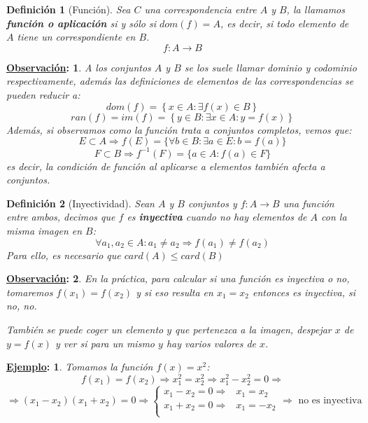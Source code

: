 \documentclass[10pt,a4paper,openright]{book}
\theoremstyle{break}
\newtheorem*{defi}{Definición}
\newtheorem*{obs}{\underline{Observación}:}
\newtheorem*{ej}{\underline{Ejemplo}:}
\begin{document}
\begin{defi}[Función]
Sea $C$ una correspondencia entre $A$ y $B$, la llamamos \textbf{función o aplicación} si y sólo si $dom(f)=A$, es decir, si todo elemento de $A$ tiene un correspondiente en $B$.
$$f: A\rightarrow B$$
\end{defi}

\begin{obs}
A los conjuntos $A$ y $B$ se los suele llamar dominio y codominio respectivamente, además las definiciones de elementos de las correspondencias se pueden reducir a:
$$dom(f)=\left\lbrace x \in A : \exists f(x)\in B\right\rbrace$$
$$ran(f)=im(f)=\left\lbrace y\in B : \exists x \in A : y=f(x)\right\rbrace$$
Además, si observamos como la función trata a conjuntos completos, vemos que:
$$E\subset A\Rightarrow f(E)=\{\forall b\in B : \exists a \in E : b=f(a)\}$$
$$F\subset B\Rightarrow f^{-1}(F)=\{a \in A : f(a)\in F\}$$
es decir, la condición de función al aplicarse a elementos también afecta a conjuntos.
\end{obs}

\begin{defi}[Inyectividad]
Sean $A$ y $B$ conjuntos y $f: A \rightarrow B$ una función entre ambos, decimos que $f$ es \textbf{inyectiva} cuando no hay elementos de $A$ con la misma imagen en $B$:
$$\forall a_1, a_2 \in A : a_1 \neq a_2\Rightarrow f(a_1)\neq f(a_2)$$
Para ello, es necesario que $card(A)\leq card(B)$
\end{defi}

\begin{obs}
En la práctica, para calcular si una función es inyectiva o no, tomaremos $f(x_1)=f(x_2)$ y si eso resulta en $x_1=x_2$ entonces es inyectiva, si no, no.

También se puede coger un elemento $y$ que pertenezca a la imagen, despejar $x$ de $y=f(x)$ y ver si para un mismo $y$ hay varios valores de $x$.
\end{obs}

\begin{ej}
Tomamos la función $f(x)=x^2$:
$$f(x_1)=f(x_2)\Rightarrow x_1^2=x_2^2\Rightarrow x_1^2-x_2^2=0 \Rightarrow$$
$$\Rightarrow (x_1-x_2)(x_1+x_2)=0 \Rightarrow
\begin{cases}
x_1-x_2=0 \Rightarrow & x_1=x_2 \\
x_1+x_2=0 \Rightarrow & x_1=-x_2 \\
\end{cases}
\Rightarrow \mbox{ no es inyectiva}$$
\end{ej}
\end{document}
